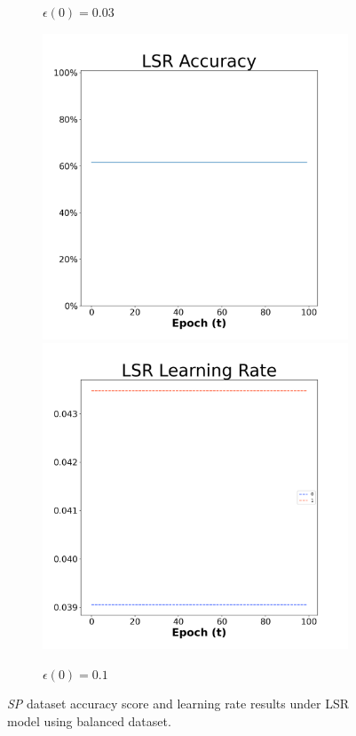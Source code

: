\begin{figure}[H]
\begin{subfigure}{0.3\textwidth}
  \caption{$\epsilon(0)=0.03$}
\end{subfigure}\hfil %
\begin{subfigure}{0.3\textwidth}
  \includegraphics[width=\linewidth]{images/exper1/SP/LSR_0.1_acc.png}
  \includegraphics[width=\linewidth]{images/exper1/SP/LSR_0.1_lr.png}
  \caption{$\epsilon(0)=0.1$}
\end{subfigure}

\caption{\textit{SP} dataset accuracy score and learning rate results under LSR model using balanced dataset.}
\end{figure}


